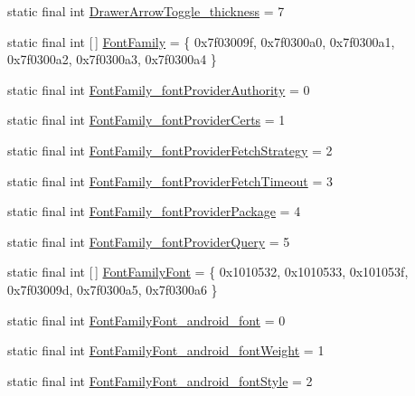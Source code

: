 \begin{DoxyCompactItemize}
static final int \mbox{\hyperlink{classcom_1_1synnapps_1_1carouselview_1_1_r_1_1styleable_a976c9d43dd4ef791aa3b8031dcbf96c0}{Drawer\+Arrow\+Toggle\+\_\+thickness}} = 7
\item 
static final int \mbox{[}$\,$\mbox{]} \mbox{\hyperlink{classcom_1_1synnapps_1_1carouselview_1_1_r_1_1styleable_a9b72d952ef433d507060c403ce9fea16}{Font\+Family}} = \{ 0x7f03009f, 0x7f0300a0, 0x7f0300a1, 0x7f0300a2, 0x7f0300a3, 0x7f0300a4 \}
\item 
static final int \mbox{\hyperlink{classcom_1_1synnapps_1_1carouselview_1_1_r_1_1styleable_a5a818d9e6b8de995b186c65ddb40a791}{Font\+Family\+\_\+font\+Provider\+Authority}} = 0
\item 
static final int \mbox{\hyperlink{classcom_1_1synnapps_1_1carouselview_1_1_r_1_1styleable_aa896bd72b6d74d118a20e7e8adc19012}{Font\+Family\+\_\+font\+Provider\+Certs}} = 1
\item 
static final int \mbox{\hyperlink{classcom_1_1synnapps_1_1carouselview_1_1_r_1_1styleable_a7ee0019bba37009ed21bda872be662f1}{Font\+Family\+\_\+font\+Provider\+Fetch\+Strategy}} = 2
\item 
static final int \mbox{\hyperlink{classcom_1_1synnapps_1_1carouselview_1_1_r_1_1styleable_af7773ef36d66d95db5a1466195b46b19}{Font\+Family\+\_\+font\+Provider\+Fetch\+Timeout}} = 3
\item 
static final int \mbox{\hyperlink{classcom_1_1synnapps_1_1carouselview_1_1_r_1_1styleable_afe297a419deb308e20df1ee9f99495dd}{Font\+Family\+\_\+font\+Provider\+Package}} = 4
\item 
static final int \mbox{\hyperlink{classcom_1_1synnapps_1_1carouselview_1_1_r_1_1styleable_a05bb255d3e0e4fbee3f346c77ac08847}{Font\+Family\+\_\+font\+Provider\+Query}} = 5
\item 
static final int \mbox{[}$\,$\mbox{]} \mbox{\hyperlink{classcom_1_1synnapps_1_1carouselview_1_1_r_1_1styleable_ae7086ed88f85f5a0ab6f8b7d27925f2a}{Font\+Family\+Font}} = \{ 0x1010532, 0x1010533, 0x101053f, 0x7f03009d, 0x7f0300a5, 0x7f0300a6 \}
\item 
static final int \mbox{\hyperlink{classcom_1_1synnapps_1_1carouselview_1_1_r_1_1styleable_af37d64e86bc961dee60cdea089aaaecc}{Font\+Family\+Font\+\_\+android\+\_\+font}} = 0
\item 
static final int \mbox{\hyperlink{classcom_1_1synnapps_1_1carouselview_1_1_r_1_1styleable_a6031fd4aaa01f18f042107227c3e5680}{Font\+Family\+Font\+\_\+android\+\_\+font\+Weight}} = 1
\item 
static final int \mbox{\hyperlink{classcom_1_1synnapps_1_1carouselview_1_1_r_1_1styleable_ad17894b953908084f73e19f758241419}{Font\+Family\+Font\+\_\+android\+\_\+font\+Style}} = 2

\end{DoxyCompactItemize}
